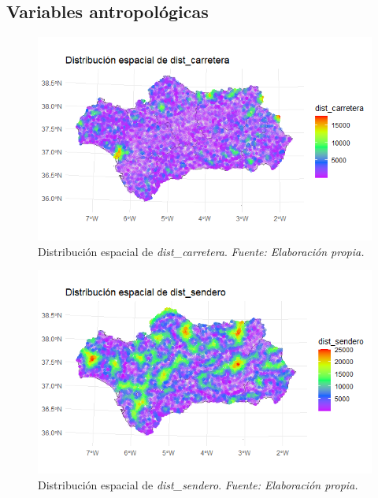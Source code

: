 \documentclass[12pt,a4paper,]{book}
\numberwithin{dummy}{section}
\theoremstyle{ocrenumbox}
\theoremstyle{blacknumex}
\theoremstyle{blacknumbox}
\theoremstyle{ocrenum}
\theoremstyle{ocrenum}
\begin{document}
\hypertarget{variables-antropoluxf3gicas}{%
\subsection{Variables
antropológicas}\label{variables-antropoluxf3gicas}}

\begin{figure}[H]
\centering
\includegraphics[width = \textwidth]{graficos/dist_carretera_spat.png}
\caption[Distribución espacial de \textit{dist\_carretera}]{Distribución espacial de \textit{dist\_carretera}. \it Fuente: Elaboración propia.}
\label{fig:dist_carretera_spat}
\end{figure}

\begin{figure}[H]
\centering
\includegraphics[width = \textwidth]{graficos/dist_sendero_spat.png}
\caption[Distribución espacial de \textit{dist\_sendero}]{Distribución espacial de \textit{dist\_sendero}. \it Fuente: Elaboración propia.}
\label{fig:dist_sendero_spat}
\end{figure}
\end{document}
